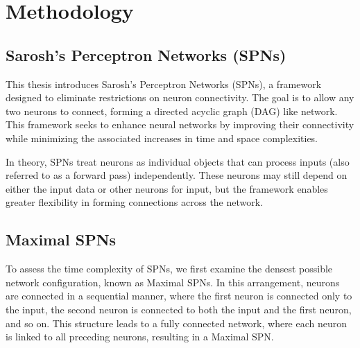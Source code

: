 
\chapter{Methodology} %

\label{Methodology} %


\section{Sarosh's Perceptron Networks (SPNs)}

This thesis introduces Sarosh's Perceptron Networks (SPNs), a framework designed to eliminate restrictions on neuron connectivity. The goal is to allow any two neurons to connect, forming a directed acyclic graph (DAG) like network. This framework seeks to enhance neural networks by improving their connectivity while minimizing the associated increases in time and space complexities.
 
In theory, SPNs treat neurons as individual objects that can process inputs (also referred to as a forward pass) independently. These neurons may still depend on either the input data or other neurons for input, but the framework enables greater flexibility in forming connections across the network.


\section{Maximal SPNs}

To assess the time complexity of SPNs, we first examine the densest possible network configuration, known as Maximal SPNs. In this arrangement, neurons are connected in a sequential manner, where the first neuron is connected only to the input, the second neuron is connected to both the input and the first neuron, and so on. This structure leads to a fully connected network, where each neuron is linked to all preceding neurons, resulting in a Maximal SPN.


